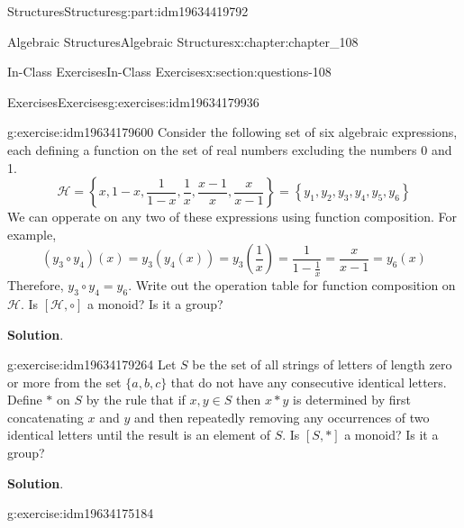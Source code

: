 \documentclass[oneside,10pt,]{book}
\newcommand{\blocktitlefont}{\relax}
\numberwithin{equation}{section}
\begin{document}
\begin{partptx}{Structures}{}{Structures}{}{}{g:part:idm19634419792}
\begin{chapterptx}{Algebraic Structures}{}{Algebraic Structures}{}{}{x:chapter:chapter_108}
\typeout{************************************************}
%
\begin{sectionptx}{In-Class Exercises}{}{In-Class Exercises}{}{}{x:section:questions-108}
%
%
%
\typeout{************************************************}
\typeout{************************************************}
%
\begin{exercises-subsection-numberless}{Exercises}{}{Exercises}{}{}{g:exercises:idm19634179936}
\par\medskip\noindent%
%
\begin{exercisegroup}
\begin{divisionexerciseeg}{1}{}{}{g:exercise:idm19634179600}%
Consider the following set of six  algebraic expressions, each defining a function on the set of real numbers excluding the numbers 0 and 1.%
\begin{equation*}
\mathcal{H}=\left\{x,1-x,\frac{1}{1-x},\frac{1}{x},\frac{x-1}{x},\frac{x}{x-1}\right\}
=\left\{y_1,y_2,y_3,y_4,y_5,y_6\right\}
\end{equation*}
We can opperate on any two of these expressions using function composition.  For example,%
\begin{equation*}
(y_3 \circ y_4)(x) = y_3(y_4(x))=y_3(\frac{1}{x})=\frac{1}{1-\frac{1}{x}}=\frac{x}{x-1}=y_6(x)
\end{equation*}
Therefore, \(y_3 \circ y_4 = y_6\).  Write out the operation table for function composition on \(\mathcal{H}\). Is \([\mathcal{H},\circ]\) a monoid? Is it a group?%
\par\smallskip%
\noindent\textbf{\blocktitlefont Solution}.\hypertarget{g:solution:idm19634178656}{}\quad{}%
\end{divisionexerciseeg}%
\begin{divisionexerciseeg}{2}{}{}{g:exercise:idm19634179264}%
Let \(S\) be the set of all strings of letters of length zero or more from the set \(\{a,b,c\}\) that do not have any consecutive identical letters.  Define \(*\) on \(S\) by the rule that if \(x, y \in S\) then \(x*y\) is determined by first concatenating  \(x\) and \(y\) and then repeatedly removing any occurrences of two identical letters until the result is an element of \(S\).   Is \([S,*]\) a monoid?  Is it a group?%
\par\smallskip%
\noindent\textbf{\blocktitlefont Solution}.\hypertarget{g:solution:idm19634175920}{}\quad{}%
\end{divisionexerciseeg}%
\begin{divisionexerciseeg}{3}{}{}{g:exercise:idm19634175184}%

\end{divisionexerciseeg}
\end{exercisegroup}
\end{exercises-subsection-numberless}
\end{sectionptx}
\end{chapterptx}
\end{partptx}
\end{document}
